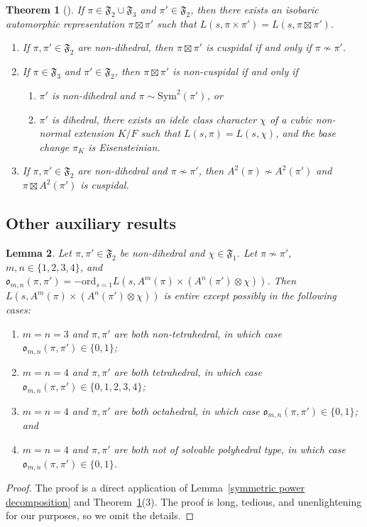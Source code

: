 \documentclass[11pt]{amsart}
\newtheorem{theorem}{Theorem}[section]
\newtheorem{lemma}[theorem]{Lemma}
\theoremstyle{remark}
\newcommand{\Sym}{\mathrm{Sym}}
\newcommand{\fF}{\mathfrak{F}}
\numberwithin{equation}{section}
\begin{document}
\begin{theorem}[\cite{KimShahidi,Ramakrishnan,RamakrishnanWang2}]
\label{thm:Langlands}
If $\pi\in\mathfrak{F}_2\cup\mathfrak{F}_3$ and $\pi'\in\mathfrak{F}_2$, then there exists an isobaric automorphic representation $\pi\boxtimes\pi'$ such that $L(s,\pi\times\pi')=L(s,\pi\boxtimes\pi')$.
\begin{enumerate}[leftmargin=*]
\item If $\pi,\pi'\in\mathfrak{F}_2$ are non-dihedral, then $\pi\boxtimes\pi'$ is cuspidal if and only if $\pi\not\sim\pi'$.
\item  If $\pi\in\mathfrak{F}_3$ and $\pi'\in\mathfrak{F}_2$, then $\pi\boxtimes\pi'$ is non-cuspidal if and only if
\begin{enumerate}
\item $\pi'$ is non-dihedral and $\pi\sim\Sym^2(\pi')$, or
\item $\pi'$ is dihedral, there exists an idele class character $\chi$ of a cubic non-normal extension $K/F$ such that $L(s,\pi)=L(s,\chi)$, and the base change $\pi_K$ is Eisensteinian.
\end{enumerate}
\item If $\pi,\pi' \in \fF_2$ are non-dihedral and $\pi \not\sim\pi'$, then $A^2(\pi) \not\sim A^2(\pi')$ and $\pi \boxtimes A^2(\pi')$ is cuspidal.
\end{enumerate}
\end{theorem}

\subsection{Other auxiliary results}


\begin{lemma}
\label{counting pole lemma}
Let $\pi,\pi' \in \fF_2$ be non-dihedral and $\chi \in \fF_1$. Let $\pi \not\sim \pi'$, $m,n\in\{1,2,3,4\}$, and $\mathfrak{o}_{m,n}(\pi,\pi')=-\mathrm{ord}_{s=1}L(s,A^m(\pi) \times (A^n(\pi') \otimes \chi))$.  Then $L(s,A^m(\pi) \times (A^n(\pi') \otimes \chi))$ is entire except possibly in the following cases:
\begin{enumerate}[leftmargin=*]
    \item $m=n=3$ and $\pi,\pi'$ are both non-tetrahedral, in which case $\mathfrak{o}_{m,n}(\pi,\pi')\in \{0,1\}$;
    \item $m=n=4$ and $\pi,\pi'$ are both tetrahedral, in which case $\mathfrak{o}_{m,n}(\pi,\pi')\in\{0,1,2,3,4\}$;
    \item $m=n=4$ and $\pi,\pi'$ are both octahedral, in which case $\mathfrak{o}_{m,n}(\pi,\pi')\in \{0,1\}$; and
    \item $m=n=4$ and $\pi,\pi'$ are both not of solvable polyhedral type, in which case $\mathfrak{o}_{m,n}(\pi,\pi')\in \{0,1\}$.
\end{enumerate}
\end{lemma}
\begin{proof}
    The proof is a direct application of Lemma~\ref{symmetric power decomposition} and Theorem~\ref{thm:Langlands}(3).  The proof is long, tedious, and unenlightening for our purposes, so we omit the details.
\end{proof}
\end{document}
